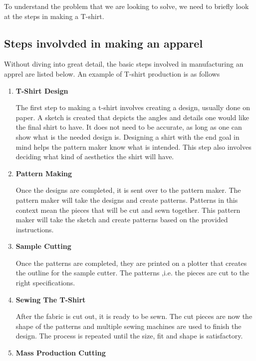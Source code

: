 \documentclass{article}
\begin{document}
To understand the problem that we are looking to solve, we need to briefly look at the steps in making a T-shirt.

    \subsection{Steps involvded in making an apparel}
    
    Without diving into great detail, the basic steps involved in manufacturing an apprel are listed below. An example of T-shirt production is as follows \cite{HowToMakeTshirt}
    
    \begin{enumerate}
    \item \textbf{T-Shirt Design}

    The first step to making a t-shirt involves creating a design, usually done on paper. A sketch is created that depicts the angles and details one would like the final shirt to have. It does not need to be accurate, as long as one can show what is the needed design is. Designing a shirt with the end goal in mind helps the pattern maker know what is intended. This step also involves deciding what kind of aesthetics the shirt will have.

    \item \textbf{Pattern Making}

    Once the designs are completed, it is sent over to the pattern maker. The pattern maker will take the designs and create patterns. Patterns in this context mean the pieces that will be cut and sewn together. This pattern maker will take the sketch and create patterns based on the provided instructions.

    \item \textbf{Sample Cutting}

    Once the patterns are completed, they are printed on a plotter that creates the outline for the sample cutter. The patterns ,i.e. the pieces are cut to the right specifications.  

    \item \textbf{Sewing The T-Shirt}

    After the fabric is cut out, it is ready to be sewn. The cut pieces are now the shape of the patterns and multiple sewing machines are used to finish the design. The process is repeated until the size, fit and shape is satisfactory.

    \item \textbf{Mass Production Cutting}


\end{enumerate}
\end{document}
